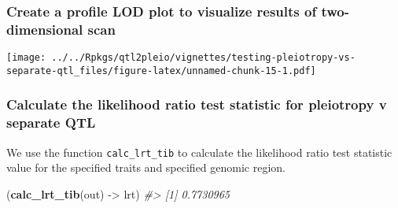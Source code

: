 \documentclass[oneside]{book}
\newenvironment{Shaded}{\begin{snugshade}}{\end{snugshade}}
\newcommand{\CommentTok}[1]{\textcolor[rgb]{0.56,0.35,0.01}{\textit{#1}}}
\newcommand{\DataTypeTok}[1]{\textcolor[rgb]{0.13,0.29,0.53}{#1}}
\newcommand{\FloatTok}[1]{\textcolor[rgb]{0.00,0.00,0.81}{#1}}
\newcommand{\KeywordTok}[1]{\textcolor[rgb]{0.13,0.29,0.53}{\textbf{#1}}}
\newcommand{\NormalTok}[1]{#1}
\newcommand{\OperatorTok}[1]{\textcolor[rgb]{0.81,0.36,0.00}{\textbf{#1}}}
\newcommand{\StringTok}[1]{\textcolor[rgb]{0.31,0.60,0.02}{#1}}
\begin{document}
\hypertarget{create-a-profile-lod-plot-to-visualize-results-of-two-dimensional-scan}{%
\subsubsection{Create a profile LOD plot to visualize results of
two-dimensional
scan}\label{create-a-profile-lod-plot-to-visualize-results-of-two-dimensional-scan}}

\begin{Shaded}
\end{Shaded}

\texttt{[image: ../../Rpkgs/qtl2pleio/vignettes/testing-pleiotropy-vs-separate-qtl\_files/figure-latex/unnamed-chunk-15-1.pdf]}

\hypertarget{calculate-the-likelihood-ratio-test-statistic-for-pleiotropy-v-separate-qtl}{%
\subsubsection{Calculate the likelihood ratio test statistic for
pleiotropy v separate
QTL}\label{calculate-the-likelihood-ratio-test-statistic-for-pleiotropy-v-separate-qtl}}

We use the function \texttt{calc\_lrt\_tib} to calculate the likelihood
ratio test statistic value for the specified traits and specified
genomic region.

\begin{Shaded}
\begin{Highlighting}[]
\NormalTok{(}\KeywordTok{calc_lrt_tib}\NormalTok{(out) ->}\StringTok{ }\NormalTok{lrt)}
\CommentTok{#> [1] 0.7730965}
\end{Highlighting}
\end{Shaded}
\end{document}
